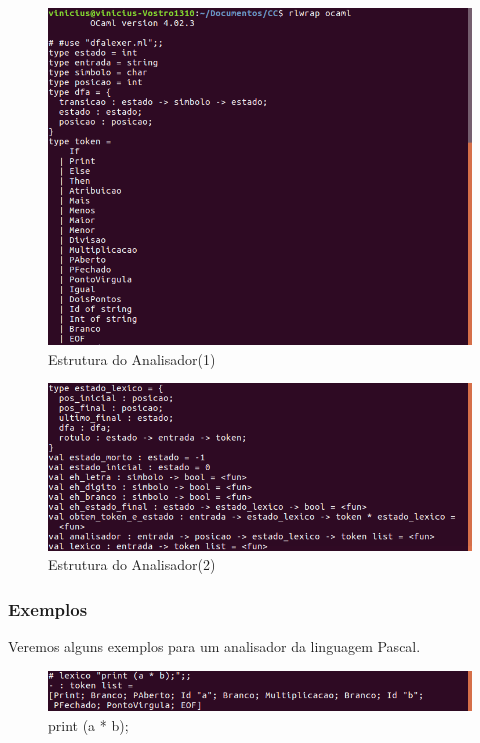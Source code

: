 \documentclass[12pt,a4paper]{report}
\begin{document}
\begin{figure}[!htb]
\centering
\includegraphics[scale=0.6]{Imagens/img1.png}
\caption{Estrutura do Analisador(1)}
\label{img1}
\end{figure}

\begin{figure}[!htb]
\centering
\includegraphics[scale=0.6]{Imagens/img2.png}
\caption{Estrutura do Analisador(2)}
\label{img2}
\end{figure}

\subsubsection{Exemplos}
Veremos alguns exemplos para um analisador da linguagem Pascal.

\begin{figure}[!htb]
\centering
\includegraphics[scale=0.6]{Imagens/img4.png}
\caption{print (a * b);}
\label{img4}
\end{figure}
\end{document}
